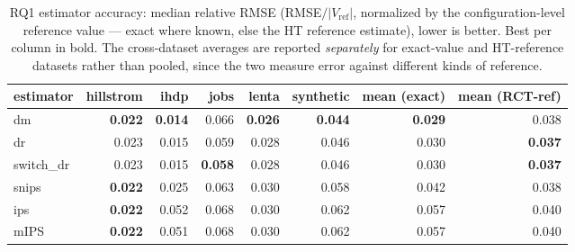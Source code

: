 \begin{table}[t]\centering
\caption{RQ1 estimator accuracy: median relative RMSE (RMSE$/|V_{\mathrm{ref}}|$, normalized by the configuration-level reference value --- exact where known, else the HT reference estimate), lower is better. Best per column in bold. The cross-dataset averages are reported \emph{separately} for exact-value and HT-reference datasets rather than pooled, since the two measure error against different kinds of reference.}
\label{tab:rq1-accuracy}
\begin{tabular}{lrrrrrrr}
\toprule
estimator & hillstrom & ihdp & jobs & lenta & synthetic & mean (exact) & mean (RCT-ref) \\
\midrule
dm & \textbf{0.022} & \textbf{0.014} & 0.066 & \textbf{0.026} & \textbf{0.044} & \textbf{0.029} & 0.038 \\
dr & 0.023 & 0.015 & 0.059 & 0.028 & 0.046 & 0.030 & \textbf{0.037} \\
switch\_dr & 0.023 & 0.015 & \textbf{0.058} & 0.028 & 0.046 & 0.030 & \textbf{0.037} \\
snips & \textbf{0.022} & 0.025 & 0.063 & 0.030 & 0.058 & 0.042 & 0.038 \\
ips & \textbf{0.022} & 0.052 & 0.068 & 0.030 & 0.062 & 0.057 & 0.040 \\
mIPS & \textbf{0.022} & 0.051 & 0.068 & 0.030 & 0.062 & 0.057 & 0.040 \\
\bottomrule
\end{tabular}
\end{table}